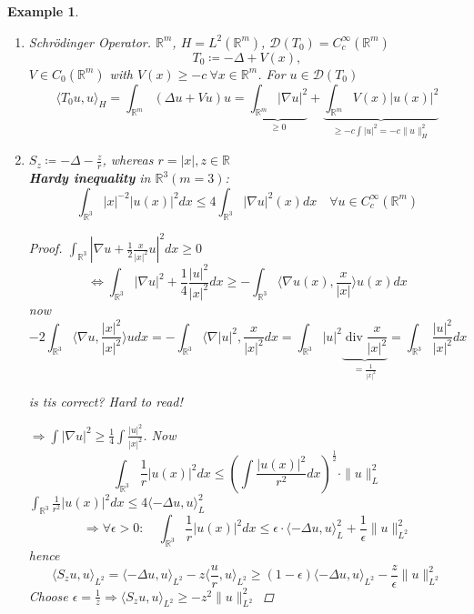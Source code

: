 \documentclass[12pt]{extreport} %
\newcommand{\R}{\mathbb{R}}
\newcommand{\DO}[1]{\mathcal{D}\left( {#1} \right)}
\theoremstyle{named}
\theoremstyle{nnamed}
\theoremstyle{itshape}
\theoremstyle{normal}
\newtheorem*{example}{Example}
\begin{document}
\begin{example} ~\
	\begin{enumerate}
		\item Schrödinger Operator. $\R^m$, $H = L^2(\R^m)$, $\DO{T_0} = C_c^\infty(\R^m)$
				$$ T_0 \coloneqq - \Delta + V(x), $$
			$V \in C_0(\R^m)$ with $V(x) \geq - c ~\forall x \in \R^m$. For $u \in \DO{T_0}$
			$$ \langle T_0 u, u \rangle_H = \int_{\R^m} \left( \Delta u + V u \right) u = \underbrace{\int_{\R^m} \left| \nabla u \right|^2}_{\geq 0} + \underbrace{\int_{\R^m} V(x) \left| u(x) \right|^2}_{\geq - c \int |u|^2 = - c \|u \|^2_H} $$
		\item $S_z \coloneqq - \Delta - \frac{z}{r}$, whereas $r = |x|, z \in \R$ ~\\ 
		
			\textbf{Hardy inequality} in $\R^3 (m = 3)$:
				$$ \int_{\R^3} |x|^{-2} |u(x)|^2 dx \leq  4 \int_{\R^3} \left| \nabla u \right|^2 (x) dx \quad \forall u \in C_c^\infty(\R^m) $$
				\begin{proof}
					$\int_{\R^3} \left| \nabla u + \frac{1}{2} \frac{x}{|x|^2} u \right|^2 dx \geq 0$ 
					$$ \iff \int_{\R^3} \left| \nabla u \right|^2 + \frac{1}{4} \frac{|u|^2}{|x|^2} dx \geq - \int_{\R^3} \langle \nabla u(x), \frac{x}{|x|} \rangle u(x) dx $$
					now
					$$ -2 \int_{\R^3} \langle \nabla u, \frac {|x|^2}{|x|^2} \rangle u dx = - \int_{\R^3} \langle \nabla |u|^2, \frac{x}{|x|^2} dx = \int_{\R^3} |u|^2 \underbrace{\operatorname{div} \frac{x}{|x|^2}}_{= \frac{1}{|x|^2}} = \int_{\R^3} \frac{|u|^2}{|x|^2} dx $$ 
				\begin{center}
					\textit{\color{red} is tis correct? Hard to read!}
				\end{center} %
					$\Rightarrow \int |\nabla u|^2 \geq \frac{1}{4} \int \frac{|u|^2}{|x|^2}$. Now
					$$ \int_{\R^3} \frac{1}{r} |u(x)|^2 dx \leq \left( \int \frac{|u(x)|^2}{r^2} dx \right)^{\frac{1}{2}} \cdot \| u \|_L^2 $$
					$\int_{\R^3} \frac{1}{r^2} |u(x)|^2 dx \leq 4 \langle - \Delta u, u \rangle_L^2$
					$$ \Rightarrow \forall \epsilon > 0: \quad \int_{\R^3} \frac{1}{r} |u(x)|^2 dx \leq \epsilon \cdot \langle-\Delta u, u \rangle_L^2 + \frac{1}{\epsilon} \| u \|_{L^2}^2 $$
					hence 
					$$ \langle S_z u, u \rangle_{L^2} = \langle - \Delta u, u \rangle_{L^2} - z \langle \frac{u}{r}, u \rangle_{L^2} \geq (1 - \epsilon) \langle - \Delta u, u \rangle_{L^2} - \frac{z}{\epsilon} \| u \|^2_{L^2} $$
					Choose $\epsilon = \frac{1}{z} \Rightarrow \langle S_z u, u \rangle_{L^2} \geq - z^2 \| u\|^2_{L^2}$
				\end{proof}
	\end{enumerate}	
\end{example}
\end{document}
